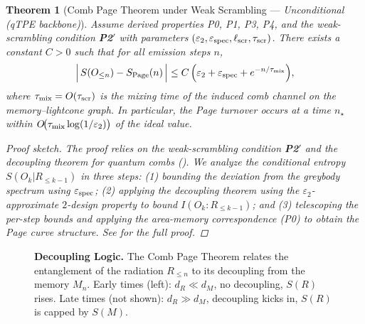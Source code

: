 \documentclass[aps,prd,preprint,onecolumn,superscriptaddress,nofootinbib,longbibliography,floatfix,11pt,showpacs,showkeys]{revtex4-2}
\newcommand{\PtwoPrime}{\textbf{P2$'$}\xspace}
\theoremstyle{plain}
\newtheorem{theorem}{Theorem}
\theoremstyle{definition}
\theoremstyle{remark}
\begin{document}
\begin{theorem}[Comb Page Theorem under Weak Scrambling --- \emph{Unconditional (qTPE backbone)}]\label{thm:comb-page-weak}
Assume derived properties P0, P1, P3, P4, and the weak-scrambling condition \PtwoPrime{} with parameters $(\varepsilon_2,\varepsilon_{\rm spec},\ell_{\rm scr},\tau_{\rm scr})$. There exists a constant $C>0$ such that for all emission steps $n$,
\begin{equation}
\Big|\, S(O_{\le n}) - S_{\rm Page}(n)\,\Big|
\le C\,\Big(\varepsilon_2 + \varepsilon_{\rm spec} + e^{-n/\tau_{\rm mix}} \Big),
\end{equation}
where $\tau_{\rm mix}=O(\tau_{\rm scr})$ is the mixing time of the induced comb channel on the memory--lightcone graph. In particular, the Page turnover occurs at a time $n_\star$ within $O\!\big(\tau_{\rm mix}\log(1/\varepsilon_2)\big)$ of the ideal value.
\begin{proof}[Proof sketch]
The proof relies on the weak-scrambling condition \PtwoPrime{} and the decoupling theorem for quantum combs (). We analyze the conditional entropy $S(O_k|R_{\le k-1})$ in three steps: (1) bounding the deviation from the greybody spectrum using $\varepsilon_{\rm spec}$; (2) applying the decoupling theorem using the $\varepsilon_2$-approximate $2$-design property to bound $I(O_k:R_{\le k-1})$; and (3) telescoping the per-step bounds and applying the area-memory correspondence (P0) to obtain the Page curve structure. See  for the full proof.
\end{proof}
\end{theorem}

\begin{figure}[t]
\centering
{}
\caption{\textbf{Decoupling Logic.} The Comb Page Theorem relates the entanglement of the radiation $R_{\le n}$ to its decoupling from the memory $M_n$. Early times (left): $d_R \ll d_M$, no decoupling, $S(R)$ rises. Late times (not shown): $d_R \gg d_M$, decoupling kicks in, $S(R)$ is capped by $S(M)$.}
\label{fig:decoupling_diagram}
\end{figure}
\end{document}
